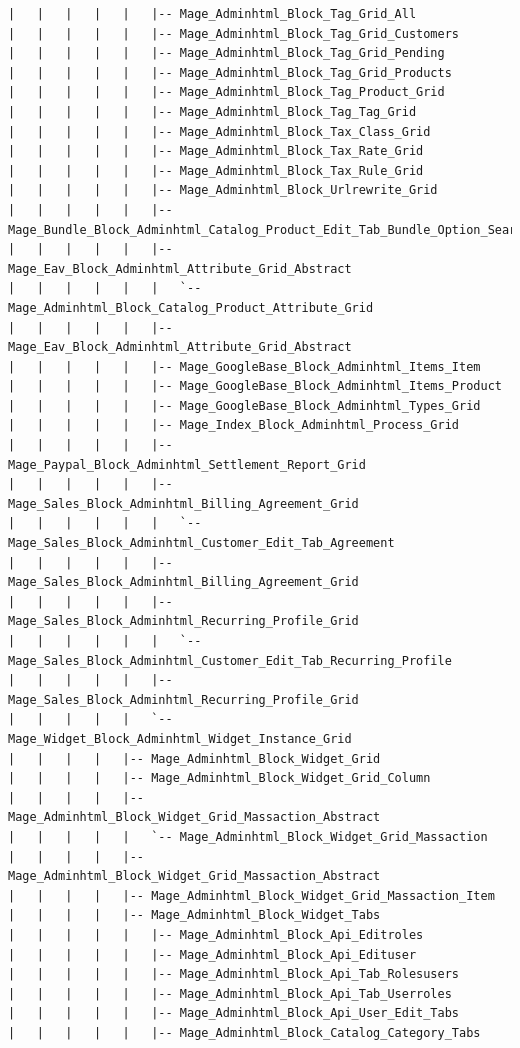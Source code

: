 \documentclass[oneside]{book}
\begin{document}
\begin{lstlisting}
|   |   |   |   |   |-- Mage_Adminhtml_Block_Tag_Grid_All
|   |   |   |   |   |-- Mage_Adminhtml_Block_Tag_Grid_Customers
|   |   |   |   |   |-- Mage_Adminhtml_Block_Tag_Grid_Pending
|   |   |   |   |   |-- Mage_Adminhtml_Block_Tag_Grid_Products
|   |   |   |   |   |-- Mage_Adminhtml_Block_Tag_Product_Grid
|   |   |   |   |   |-- Mage_Adminhtml_Block_Tag_Tag_Grid
|   |   |   |   |   |-- Mage_Adminhtml_Block_Tax_Class_Grid
|   |   |   |   |   |-- Mage_Adminhtml_Block_Tax_Rate_Grid
|   |   |   |   |   |-- Mage_Adminhtml_Block_Tax_Rule_Grid
|   |   |   |   |   |-- Mage_Adminhtml_Block_Urlrewrite_Grid
|   |   |   |   |   |-- Mage_Bundle_Block_Adminhtml_Catalog_Product_Edit_Tab_Bundle_Option_Search_Grid
|   |   |   |   |   |-- Mage_Eav_Block_Adminhtml_Attribute_Grid_Abstract
|   |   |   |   |   |   `-- Mage_Adminhtml_Block_Catalog_Product_Attribute_Grid
|   |   |   |   |   |-- Mage_Eav_Block_Adminhtml_Attribute_Grid_Abstract
|   |   |   |   |   |-- Mage_GoogleBase_Block_Adminhtml_Items_Item
|   |   |   |   |   |-- Mage_GoogleBase_Block_Adminhtml_Items_Product
|   |   |   |   |   |-- Mage_GoogleBase_Block_Adminhtml_Types_Grid
|   |   |   |   |   |-- Mage_Index_Block_Adminhtml_Process_Grid
|   |   |   |   |   |-- Mage_Paypal_Block_Adminhtml_Settlement_Report_Grid
|   |   |   |   |   |-- Mage_Sales_Block_Adminhtml_Billing_Agreement_Grid
|   |   |   |   |   |   `-- Mage_Sales_Block_Adminhtml_Customer_Edit_Tab_Agreement
|   |   |   |   |   |-- Mage_Sales_Block_Adminhtml_Billing_Agreement_Grid
|   |   |   |   |   |-- Mage_Sales_Block_Adminhtml_Recurring_Profile_Grid
|   |   |   |   |   |   `-- Mage_Sales_Block_Adminhtml_Customer_Edit_Tab_Recurring_Profile
|   |   |   |   |   |-- Mage_Sales_Block_Adminhtml_Recurring_Profile_Grid
|   |   |   |   |   `-- Mage_Widget_Block_Adminhtml_Widget_Instance_Grid
|   |   |   |   |-- Mage_Adminhtml_Block_Widget_Grid
|   |   |   |   |-- Mage_Adminhtml_Block_Widget_Grid_Column
|   |   |   |   |-- Mage_Adminhtml_Block_Widget_Grid_Massaction_Abstract
|   |   |   |   |   `-- Mage_Adminhtml_Block_Widget_Grid_Massaction
|   |   |   |   |-- Mage_Adminhtml_Block_Widget_Grid_Massaction_Abstract
|   |   |   |   |-- Mage_Adminhtml_Block_Widget_Grid_Massaction_Item
|   |   |   |   |-- Mage_Adminhtml_Block_Widget_Tabs
|   |   |   |   |   |-- Mage_Adminhtml_Block_Api_Editroles
|   |   |   |   |   |-- Mage_Adminhtml_Block_Api_Edituser
|   |   |   |   |   |-- Mage_Adminhtml_Block_Api_Tab_Rolesusers
|   |   |   |   |   |-- Mage_Adminhtml_Block_Api_Tab_Userroles
|   |   |   |   |   |-- Mage_Adminhtml_Block_Api_User_Edit_Tabs
|   |   |   |   |   |-- Mage_Adminhtml_Block_Catalog_Category_Tabs

\end{lstlisting}
\end{document}
